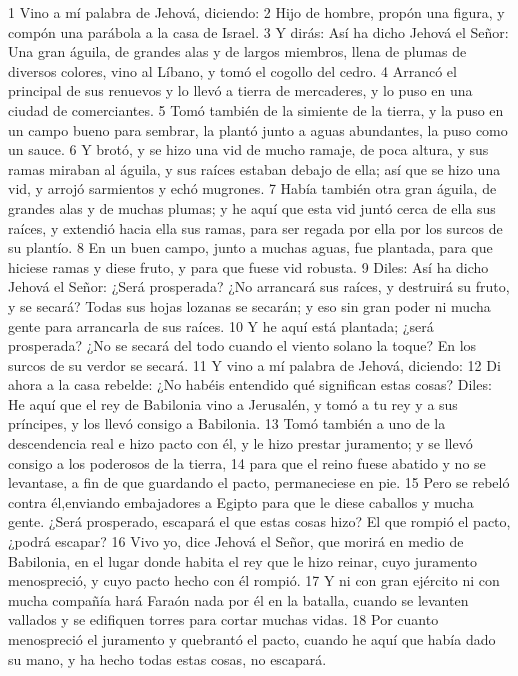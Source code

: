 1 Vino a mí palabra de Jehová, diciendo:
2 Hijo de hombre, propón una figura, y compón una parábola a la casa de Israel.
3 Y dirás: Así ha dicho Jehová el Señor: Una gran águila, de grandes alas y de largos miembros, llena de plumas de diversos colores, vino al Líbano, y tomó el cogollo del cedro.
4 Arrancó el principal de sus renuevos y lo llevó a tierra de mercaderes, y lo puso en una ciudad de comerciantes.
5 Tomó también de la simiente de la tierra, y la puso en un campo bueno para sembrar, la plantó junto a aguas abundantes, la puso como un sauce.
6 Y brotó, y se hizo una vid de mucho ramaje, de poca altura, y sus ramas miraban al águila, y sus raíces estaban debajo de ella; así que se hizo una vid, y arrojó sarmientos y echó mugrones.
7 Había también otra gran águila, de grandes alas y de muchas plumas; y he aquí que esta vid juntó cerca de ella sus raíces, y extendió hacia ella sus ramas, para ser regada por ella por los surcos de su plantío.
8 En un buen campo, junto a muchas aguas, fue plantada, para que hiciese ramas y diese fruto, y para que fuese vid robusta.
9 Diles: Así ha dicho Jehová el Señor: ¿Será prosperada? ¿No arrancará sus raíces, y destruirá su fruto, y se secará? Todas sus hojas lozanas se secarán; y eso sin gran poder ni mucha gente para arrancarla de sus raíces.
10 Y he aquí está plantada; ¿será prosperada? ¿No se secará del todo cuando el viento solano la toque? En los surcos de su verdor se secará.
11 Y vino a mí palabra de Jehová, diciendo:
12 Di ahora a la casa rebelde: ¿No habéis entendido qué significan estas cosas? Diles: He aquí que el rey de Babilonia vino a Jerusalén, y tomó a tu rey y a sus príncipes, y los llevó consigo a Babilonia.
13 Tomó también a uno de la descendencia real e hizo pacto con él, y le hizo prestar juramento; y se llevó consigo a los poderosos de la tierra, 
14 para que el reino fuese abatido y no se levantase, a fin de que guardando el pacto, permaneciese en pie.
15 Pero se rebeló contra él,enviando embajadores a Egipto para que le diese caballos y mucha gente. ¿Será prosperado, escapará el que estas cosas hizo? El que rompió el pacto, ¿podrá escapar?
16 Vivo yo, dice Jehová el Señor, que morirá en medio de Babilonia, en el lugar donde habita el rey que le hizo reinar, cuyo juramento menospreció, y cuyo pacto hecho con él rompió.
17 Y ni con gran ejército ni con mucha compañía hará Faraón nada por él en la batalla, cuando se levanten vallados y se edifiquen torres para cortar muchas vidas.
18 Por cuanto menospreció el juramento y quebrantó el pacto, cuando he aquí que había dado su mano, y ha hecho todas estas cosas, no escapará.
